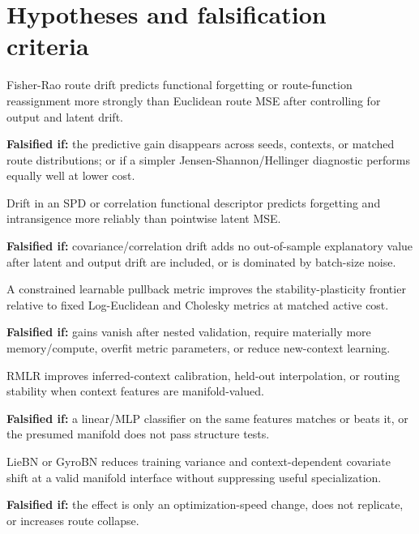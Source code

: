 \section{Hypotheses and falsification criteria}

\begin{hypothesis}
Fisher-Rao route drift predicts functional forgetting or route-function reassignment more strongly than Euclidean route MSE after controlling for output and latent drift.
\end{hypothesis}
\textbf{Falsified if:} the predictive gain disappears across seeds, contexts, or matched route distributions; or if a simpler Jensen-Shannon/Hellinger diagnostic performs equally well at lower cost.

\begin{hypothesis}
Drift in an SPD or correlation functional descriptor predicts forgetting and intransigence more reliably than pointwise latent MSE.
\end{hypothesis}
\textbf{Falsified if:} covariance/correlation drift adds no out-of-sample explanatory value after latent and output drift are included, or is dominated by batch-size noise.

\begin{hypothesis}
A constrained learnable pullback metric improves the stability-plasticity frontier relative to fixed Log-Euclidean and Cholesky metrics at matched active cost.
\end{hypothesis}
\textbf{Falsified if:} gains vanish after nested validation, require materially more memory/compute, overfit metric parameters, or reduce new-context learning.

\begin{hypothesis}
RMLR improves inferred-context calibration, held-out interpolation, or routing stability when context features are manifold-valued.
\end{hypothesis}
\textbf{Falsified if:} a linear/MLP classifier on the same features matches or beats it, or the presumed manifold does not pass structure tests.

\begin{hypothesis}
LieBN or GyroBN reduces training variance and context-dependent covariate shift at a valid manifold interface without suppressing useful specialization.
\end{hypothesis}
\textbf{Falsified if:} the effect is only an optimization-speed change, does not replicate, or increases route collapse.

